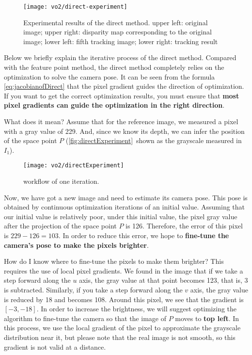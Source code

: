 {\begin{figure}[!htp]
	\centering
	\texttt{[image: vo2/direct-experiment]}
	\caption{Experimental results of the direct method. upper left: original image; upper right: disparity map corresponding to the original image; lower left: fifth tracking image; lower right: tracking result}
	\label{fig:direct-experiment}
\end{figure}

Below we briefly explain the iterative process of the direct method. Compared with the feature point method, the direct method completely relies on the optimization to solve the camera pose. It can be seen from the formula \eqref{eq:jacobianofDirect} that the pixel gradient guides the direction of optimization. If you want to get the correct optimization results, you must ensure that \textbf{most pixel gradients can guide the optimization in the right direction}.

What does it mean? Assume that for the reference image, we measured a pixel with a gray value of 229. And, since we know its depth, we can infer the position of the space point $P$ (\autoref{fig:directExperiment}~shown as the grayscale measured in $I_1$).

\begin{figure}[!htp]
	\centering
	\texttt{[image: vo2/directExperiment]}
	\caption{workflow of one iteration.}
	\label{fig:directExperiment}
\end{figure}

Now, we have got a new image and need to estimate its camera pose. This pose is obtained by continuous optimization iterations of an initial value. Assuming that our initial value is relatively poor, under this initial value, the pixel gray value after the projection of the space point $P$ is 126. Therefore, the error of this pixel is $229-126=103$. In order to reduce this error, we hope to \textbf{fine-tune the camera's pose to make the pixels brighter}.

How do I know where to fine-tune the pixels to make them brighter? This requires the use of local pixel gradients. We found in the image that if we take a step forward along the $u$ axis, the gray value at that point becomes 123, that is, 3 is subtracted. Similarly, if you take a step forward along the $v$ axis, the gray value is reduced by 18 and becomes 108. Around this pixel, we see that the gradient is $[-3,-18]$. In order to increase the brightness, we will suggest optimizing the algorithm to fine-tune the camera so that the image of $P$ moves to \textbf{top left}. In this process, we use the local gradient of the pixel to approximate the grayscale distribution near it, but please note that the real image is not smooth, so this gradient is not valid at a distance.

}
